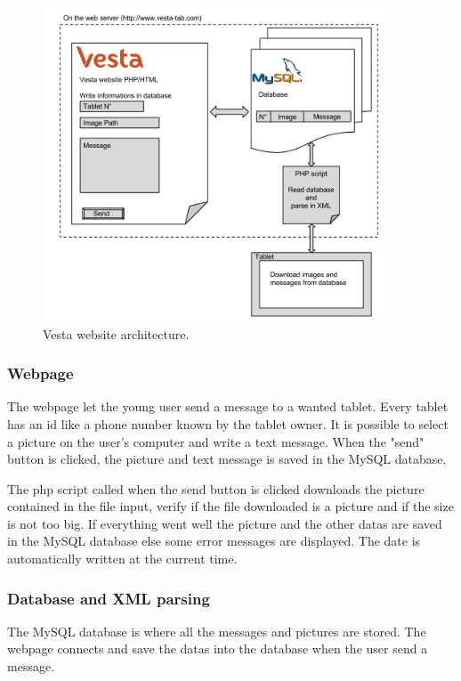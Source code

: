 \begin{figure}[!htb]
    \centering
    \includegraphics[width=0.9\textwidth,keepaspectratio]{chap/softFig/vesta_website2}
    \caption{Vesta website architecture.}
    \label{fig:web archi}
\end{figure}

\subsubsection{Webpage}
The webpage let the young user send a message to a wanted tablet. Every tablet has an id like a phone number known by the tablet owner. It is possible to select a picture on the user's computer and write a text message. When the "send" button is clicked, the picture and text message is saved in the MySQL database.

The php script called when the send button is clicked downloads the picture contained in the file input, verify if the file downloaded is a picture and if the size is not too big. If everything went well the picture and the other datas are saved in the MySQL database else some error messages are displayed. The date is automatically written at the current time.

\subsubsection{Database and XML parsing}
The MySQL database is where all the messages and pictures are stored. The webpage connects and save the datas into the database when the user send a message.

